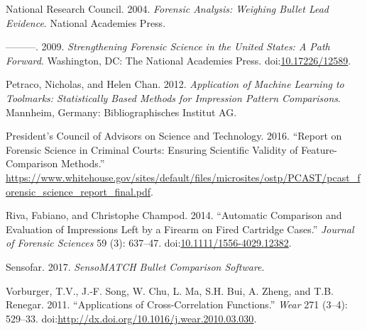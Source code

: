 \documentclass[12pt,]{article}
\theoremstyle{definition}
\theoremstyle{definition}
\theoremstyle{definition}
\theoremstyle{remark}
\begin{document}
\hypertarget{ref-national2004forensic}{}
National Research Council. 2004. \emph{Forensic Analysis: Weighing
Bullet Lead Evidence}. National Academies Press.

\hypertarget{ref-NAS:2009}{}
---------. 2009. \emph{Strengthening Forensic Science in the United
States: A Path Forward}. Washington, DC: The National Academies Press.
doi:\href{https://doi.org/10.17226/12589}{10.17226/12589}.

\hypertarget{ref-petraco:2012}{}
Petraco, Nicholas, and Helen Chan. 2012. \emph{Application of Machine
Learning to Toolmarks: Statistically Based Methods for Impression
Pattern Comparisons}. Mannheim, Germany: Bibliographisches Institut AG.

\hypertarget{ref-pcast2016}{}
President's Council of Advisors on Science and Technology. 2016.
``Report on Forensic Science in Criminal Courts: Ensuring Scientific
Validity of Feature-Comparison Methods.''
\url{https://www.whitehouse.gov/sites/default/files/microsites/ostp/PCAST/pcast_forensic_science_report_final.pdf}.

\hypertarget{ref-riva:2014}{}
Riva, Fabiano, and Christophe Champod. 2014. ``Automatic Comparison and
Evaluation of Impressions Left by a Firearm on Fired Cartridge Cases.''
\emph{Journal of Forensic Sciences} 59 (3): 637--47.
doi:\href{https://doi.org/10.1111/1556-4029.12382}{10.1111/1556-4029.12382}.

\hypertarget{ref-sensofar}{}
Sensofar. 2017. \emph{SensoMATCH Bullet Comparison Software}.

\hypertarget{ref-vorburger:2011}{}
Vorburger, T.V., J.-F. Song, W. Chu, L. Ma, S.H. Bui, A. Zheng, and T.B.
Renegar. 2011. ``Applications of Cross-Correlation Functions.''
\emph{Wear} 271 (3--4): 529--33.
doi:\href{https://doi.org/http://dx.doi.org/10.1016/j.wear.2010.03.030}{http://dx.doi.org/10.1016/j.wear.2010.03.030}.
\end{document}
